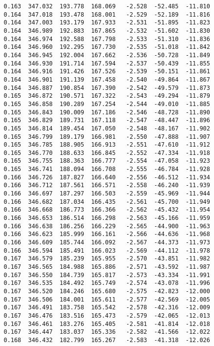 \begin{verbatim}
   0.163  347.032  193.778  168.069   -2.528  -52.485  -11.810
   0.164  347.018  193.478  168.001   -2.529  -52.189  -11.816
   0.164  347.003  193.179  167.933   -2.531  -51.895  -11.823
   0.164  346.989  192.883  167.865   -2.532  -51.602  -11.830
   0.164  346.974  192.588  167.798   -2.533  -51.310  -11.836
   0.164  346.960  192.295  167.730   -2.535  -51.018  -11.842
   0.164  346.945  192.004  167.662   -2.536  -50.728  -11.849
   0.164  346.930  191.714  167.594   -2.537  -50.439  -11.855
   0.164  346.916  191.426  167.526   -2.539  -50.151  -11.861
   0.164  346.901  191.139  167.458   -2.540  -49.864  -11.867
   0.164  346.887  190.854  167.390   -2.542  -49.579  -11.873
   0.165  346.872  190.571  167.322   -2.543  -49.294  -11.879
   0.165  346.858  190.289  167.254   -2.544  -49.010  -11.885
   0.165  346.843  190.009  167.186   -2.546  -48.728  -11.890
   0.165  346.829  189.731  167.118   -2.547  -48.447  -11.896
   0.165  346.814  189.454  167.050   -2.548  -48.167  -11.902
   0.165  346.799  189.179  166.981   -2.550  -47.888  -11.907
   0.165  346.785  188.905  166.913   -2.551  -47.610  -11.912
   0.165  346.770  188.633  166.845   -2.552  -47.334  -11.918
   0.165  346.755  188.363  166.777   -2.554  -47.058  -11.923
   0.165  346.741  188.094  166.708   -2.555  -46.784  -11.928
   0.166  346.726  187.827  166.640   -2.556  -46.512  -11.934
   0.166  346.712  187.561  166.571   -2.558  -46.240  -11.939
   0.166  346.697  187.297  166.503   -2.559  -45.969  -11.944
   0.166  346.682  187.034  166.435   -2.561  -45.700  -11.949
   0.166  346.668  186.773  166.366   -2.562  -45.432  -11.954
   0.166  346.653  186.514  166.298   -2.563  -45.166  -11.959
   0.166  346.638  186.256  166.229   -2.565  -44.900  -11.963
   0.166  346.623  185.999  166.161   -2.566  -44.636  -11.968
   0.166  346.609  185.744  166.092   -2.567  -44.373  -11.973
   0.166  346.594  185.491  166.023   -2.569  -44.112  -11.978
   0.167  346.579  185.239  165.955   -2.570  -43.851  -11.982
   0.167  346.565  184.988  165.886   -2.571  -43.592  -11.987
   0.167  346.550  184.739  165.817   -2.573  -43.334  -11.991
   0.167  346.535  184.492  165.749   -2.574  -43.078  -11.996
   0.167  346.520  184.246  165.680   -2.575  -42.823  -12.000
   0.167  346.506  184.001  165.611   -2.577  -42.569  -12.005
   0.167  346.491  183.758  165.542   -2.578  -42.316  -12.009
   0.167  346.476  183.516  165.473   -2.579  -42.065  -12.013
   0.167  346.461  183.276  165.405   -2.581  -41.814  -12.018
   0.167  346.447  183.037  165.336   -2.582  -41.566  -12.022
   0.168  346.432  182.799  165.267   -2.583  -41.318  -12.026

\end{verbatim}
